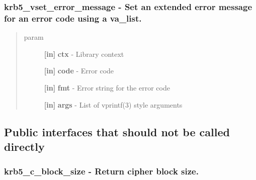 \documentclass[letterpaper,10pt,english]{sphinxmanual}
\begin{document}
\subsubsection{krb5\_vset\_error\_message -  Set an extended error message for an error code using a va\_list.}
\label{appdev/refs/api/krb5_vset_error_message:krb5-vset-error-message-set-an-extended-error-message-for-an-error-code-using-a-va-list}\label{appdev/refs/api/krb5_vset_error_message::doc}

\begin{fulllineitems}
\label{appdev/refs/api/krb5_vset_error_message:krb5_vset_error_message}
\end{fulllineitems}

\begin{quote}\begin{description}
\item[{param}] \leavevmode
\textbf{{[}in{]}} \textbf{ctx} - Library context

\textbf{{[}in{]}} \textbf{code} - Error code

\textbf{{[}in{]}} \textbf{fmt} - Error string for the error code

\textbf{{[}in{]}} \textbf{args} - List of vprintf(3) style arguments

\end{description}\end{quote}


\subsection{Public interfaces that should not be called directly}
\label{appdev/refs/api/index:public-interfaces-that-should-not-be-called-directly}

\subsubsection{krb5\_c\_block\_size -  Return cipher block size.}
\label{appdev/refs/api/krb5_c_block_size:krb5-c-block-size-return-cipher-block-size}\label{appdev/refs/api/krb5_c_block_size::doc}
\end{document}
